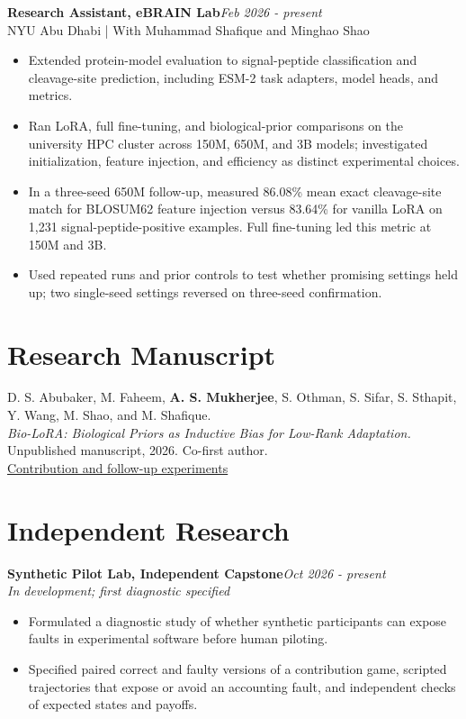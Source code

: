 \documentclass[a4paper,11pt]{article}
\newcommand{\entry}[2]{\textbf{#1}\hfill\textit{#2}}
\begin{document}
\entry{Research Assistant, eBRAIN Lab}{Feb 2026 - present}\\
NYU Abu Dhabi \;|\; With Muhammad Shafique and Minghao Shao
\begin{itemize}
\item Extended protein-model evaluation to signal-peptide classification and cleavage-site prediction, including ESM-2 task adapters, model heads, and metrics.
\item Ran LoRA, full fine-tuning, and biological-prior comparisons on the university HPC cluster across 150M, 650M, and 3B models; investigated initialization, feature injection, and efficiency as distinct experimental choices.
\item In a three-seed 650M follow-up, measured 86.08\% mean exact cleavage-site match for BLOSUM62 feature injection versus 83.64\% for vanilla LoRA on 1,231 signal-peptide-positive examples. Full fine-tuning led this metric at 150M and 3B.
\item Used repeated runs and prior controls to test whether promising settings held up; two single-seed settings reversed on three-seed confirmation.
\end{itemize}

\section*{Research Manuscript}
D. S. Abubaker, M. Faheem, \textbf{A. S. Mukherjee}, S. Othman, S. Sifar, S. Sthapit, Y. Wang, M. Shao, and M. Shafique.\\
\textit{Bio-LoRA: Biological Priors as Inductive Bias for Low-Rank Adaptation.}\\
Unpublished manuscript, 2026. Co-first author.\\
\href{https://ashmitmukherjee.com/work/protein-language-models/}{Contribution and follow-up experiments}

\newpage
\section*{Independent Research}
\entry{Synthetic Pilot Lab, Independent Capstone}{Oct 2026 - present}\\
\textit{In development; first diagnostic specified}
\begin{itemize}
\item Formulated a diagnostic study of whether synthetic participants can expose faults in experimental software before human piloting.
\item Specified paired correct and faulty versions of a contribution game, scripted trajectories that expose or avoid an accounting fault, and independent checks of expected states and payoffs.
\end{itemize}
\end{document}
